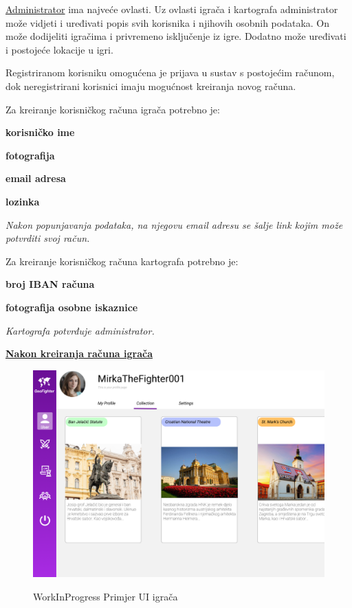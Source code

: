 		\textnormal{\underline{Administrator} ima najveće ovlasti. Uz ovlasti igrača i kartografa administrator može vidjeti i uređivati popis svih korisnika i njihovih osobnih  podataka. On može dodijeliti  igračima i privremeno isključenje iz igre. Dodatno može uređivati i postojeće lokacije u igri.}
		
		\textnormal{Registriranom korisniku omogućena je prijava u sustav s postojećim računom, dok neregistrirani korisnici imaju mogućnost kreiranja novog računa.}
		
		\textnormal{Za kreiranje korisničkog računa igrača potrebno je:}
		\begin{packed_item}
			\item \textbf{korisničko ime}
			\item \textbf{fotografija}
			\item \textbf{email adresa}
			\item \textbf{lozinka}
		\end{packed_item}
		\textit{Nakon  popunjavanja  podataka,  na njegovu email adresu se šalje link kojim može potvrditi svoj račun.}
		
		\textnormal{Za kreiranje korisničkog računa kartografa potrebno je:}
		\begin{packed_item}
			\item \textbf{broj IBAN računa}
			\item \textbf{fotografija osobne iskaznice}
		\end{packed_item}
		\textit{Kartografa potvrđuje administrator.}
		
		\textbf{\underline{Nakon kreiranja računa igrača}}
		\begin{figure}[H]
			\centering
			\includegraphics[scale=0.2]{slike/example} \\%
			\caption{WorkInProgress Primjer UI igrača}
			\label{fig:example} %
		\end{figure}
	
